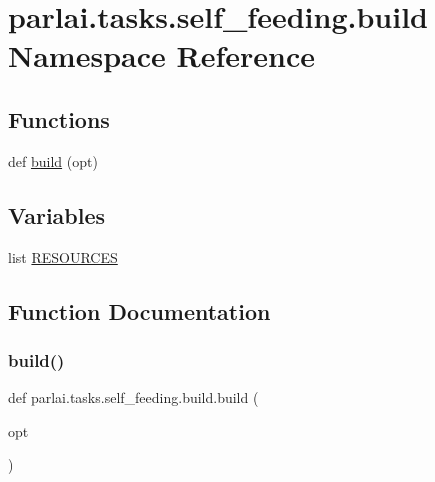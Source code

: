 \hypertarget{namespaceparlai_1_1tasks_1_1self__feeding_1_1build}{}\section{parlai.\+tasks.\+self\+\_\+feeding.\+build Namespace Reference}
\label{namespaceparlai_1_1tasks_1_1self__feeding_1_1build}
\subsection*{Functions}
\begin{DoxyCompactItemize}
\item 
def \hyperlink{namespaceparlai_1_1tasks_1_1self__feeding_1_1build_a59c71646a74f5762ffb019cf79fd9091}{build} (opt)
\end{DoxyCompactItemize}
\subsection*{Variables}
\begin{DoxyCompactItemize}
\item 
list \hyperlink{namespaceparlai_1_1tasks_1_1self__feeding_1_1build_a8f48c31661cb0f086a2f690bc6214c1e}{R\+E\+S\+O\+U\+R\+C\+ES}
\end{DoxyCompactItemize}


\subsection{Function Documentation}
\mbox{\label{namespaceparlai_1_1tasks_1_1self__feeding_1_1build_a59c71646a74f5762ffb019cf79fd9091}} 
\subsubsection{\texorpdfstring{build()}{build()}}
{\footnotesize\ttfamily def parlai.\+tasks.\+self\+\_\+feeding.\+build.\+build (\begin{DoxyParamCaption}\item[{}]{opt }\end{DoxyParamCaption})}



